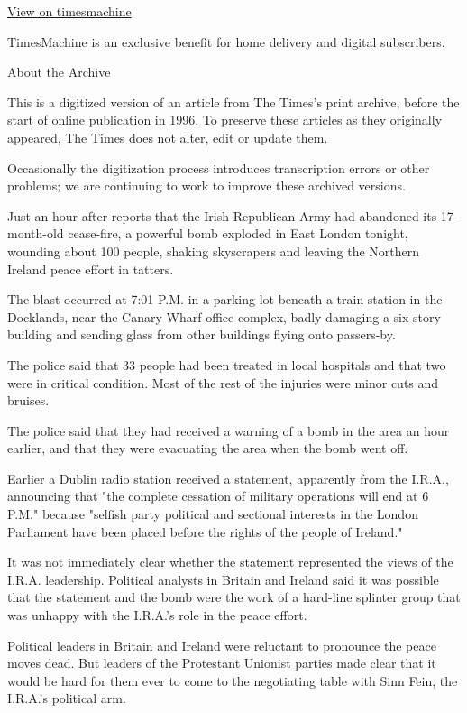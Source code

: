 \href{http://timesmachine.nytimes.com/timesmachine/1996/02/10/033677.html}{View
on timesmachine}

TimesMachine is an exclusive benefit for home delivery and digital
subscribers.

About the Archive

This is a digitized version of an article from The Times's print
archive, before the start of online publication in 1996. To preserve
these articles as they originally appeared, The Times does not alter,
edit or update them.

Occasionally the digitization process introduces transcription errors or
other problems; we are continuing to work to improve these archived
versions.

Just an hour after reports that the Irish Republican Army had abandoned
its 17-month-old cease-fire, a powerful bomb exploded in East London
tonight, wounding about 100 people, shaking skyscrapers and leaving the
Northern Ireland peace effort in tatters.

The blast occurred at 7:01 P.M. in a parking lot beneath a train station
in the Docklands, near the Canary Wharf office complex, badly damaging a
six-story building and sending glass from other buildings flying onto
passers-by.

The police said that 33 people had been treated in local hospitals and
that two were in critical condition. Most of the rest of the injuries
were minor cuts and bruises.

The police said that they had received a warning of a bomb in the area
an hour earlier, and that they were evacuating the area when the bomb
went off.

Earlier a Dublin radio station received a statement, apparently from the
I.R.A., announcing that "the complete cessation of military operations
will end at 6 P.M." because "selfish party political and sectional
interests in the London Parliament have been placed before the rights of
the people of Ireland."

It was not immediately clear whether the statement represented the views
of the I.R.A. leadership. Political analysts in Britain and Ireland said
it was possible that the statement and the bomb were the work of a
hard-line splinter group that was unhappy with the I.R.A.'s role in the
peace effort.

Political leaders in Britain and Ireland were reluctant to pronounce the
peace moves dead. But leaders of the Protestant Unionist parties made
clear that it would be hard for them ever to come to the negotiating
table with Sinn Fein, the I.R.A.'s political arm.

